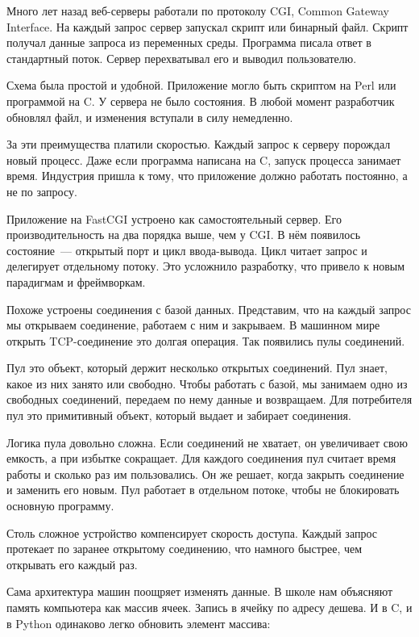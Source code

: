 Много лет назад веб-серверы работали по протоколу CGI, Common Gateway
Interface. На
каждый запрос сервер запускал скрипт или бинарный файл. Скрипт получал данные
запроса из переменных среды. Программа писала ответ в стандартный поток. Сервер
перехватывал его и выводил пользователю.

Схема была простой и удобной. Приложение могло быть скриптом на Perl или
программой на C\Plus\Plus. У сервера не было состояния. В любой момент
разработчик обновлял файл, и изменения вступали в силу немедленно.

За эти преимущества платили скоростью. Каждый запрос к серверу порождал новый
процесс. Даже если программа написана на C, запуск процесса занимает
время. Индустрия пришла к тому, что приложение должно работать постоянно, а не
по запросу.

Приложение на FastCGI устроено как самостоятельный сервер. Его
производительность на два порядка выше, чем у CGI. В н\"{е}м появилось
состояние~--- открытый порт и цикл ввода-вывода. Цикл читает запрос и делегирует
отдельному потоку. Это усложнило разработку, что привело к новым парадигмам
и фреймворкам.

Похоже устроены соединения с базой данных. Представим, что на каждый запрос мы
открываем соединение, работаем с ним и закрываем. В машинном мире открыть
TCP-соединение это долгая операция. Так появились пулы соединений.

Пул это объект, который держит несколько открытых соединений. Пул знает, какое
из них занято или свободно. Чтобы работать с базой, мы занимаем одно из
свободных соединений, передаем по нему данные и возвращаем. Для потребителя пул
это примитивный объект, который выдает и забирает соединения.

Логика пула довольно сложна. Если соединений не хватает, он
увеличивает свою емкость, а при избытке сокращает. Для каждого соединения пул
считает время работы и сколько раз им пользовались. Он же решает, когда закрыть
соединение и заменить его новым. Пул работает в отдельном потоке, чтобы не
блокировать основную программу.

Столь сложное устройство компенсирует скорость доступа. Каждый запрос протекает
по заранее открытому соединению, что намного быстрее, чем открывать его каждый
раз.

Сама архитектура машин поощряет изменять данные. В школе нам объясняют память
компьютера как массив ячеек. Запись в ячейку по адресу дешева. И в C\Plus\Plus,
и в Python одинаково легко обновить элемент массива:

